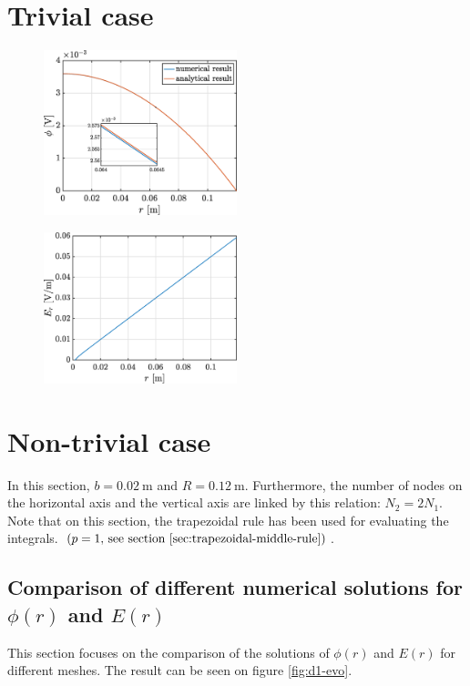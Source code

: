 \documentclass[a4paper,12pt,twoside]{article}
\newcommand{\bracket}[1]{\left(#1\right)}
\begin{document}
  \section{Trivial case}

  \begin{figure}
   \centering
   \includegraphics[width=0.5\textwidth]{graphs/c_phi.eps}
   \label{cphi}
  \end{figure}

  \begin{figure}
   \centering
   \includegraphics[width=0.5\textwidth]{graphs/c_Er.eps}
   \label{cEr}
  \end{figure}

  \section{Non-trivial case}
  In this section, $b=\SI{0.02}{\m}$ and $R=\SI{0.12}{\m}$.
  Furthermore, the number of nodes on the horizontal axis and the vertical axis are linked by this relation: $N_2 = 2N_1$.
  Note that on this section, the trapezoidal rule has been used for evaluating the integrals. $\bracket{p=1\text{, see section \ref{sec:trapezoidal-middle-rule}}}$.

  \subsection{Comparison of different numerical solutions for $\phi\bracket{r}$ and $E\bracket{r}$}
  This section focuses on the comparison of the solutions of $\phi\bracket{r}$ and $E\bracket{r}$ for different meshes.
  The result can be seen on figure \ref{fig:d1-evo}.
\end{document}
